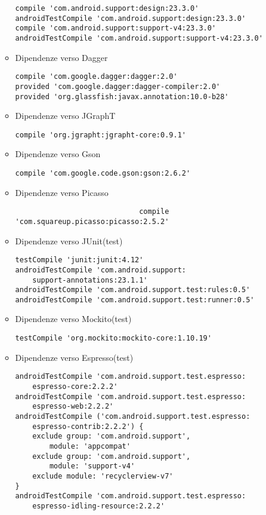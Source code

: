 \documentclass[../ManualeSviluppatore.tex]{subfiles}
\begin{document}
\begin{itemize}
\begin{itemize}
\begin{lstlisting}
compile 'com.android.support:design:23.3.0'
androidTestCompile 'com.android.support:design:23.3.0'
compile 'com.android.support:support-v4:23.3.0'
androidTestCompile 'com.android.support:support-v4:23.3.0'
						\end{lstlisting}
					\item Dipendenze verso Dagger
						\lstset{language=Java}
						\begin{lstlisting}
compile 'com.google.dagger:dagger:2.0'
provided 'com.google.dagger:dagger-compiler:2.0'
provided 'org.glassfish:javax.annotation:10.0-b28'
						\end{lstlisting}
					\item Dipendenze verso JGraphT
						\lstset{language=Java}
						\begin{lstlisting}
compile 'org.jgrapht:jgrapht-core:0.9.1'
						\end{lstlisting}
					\item Dipendenze verso Gson
						\lstset{language=Java}
						\begin{lstlisting}
compile 'com.google.code.gson:gson:2.6.2'
						\end{lstlisting}
					\item Dipendenze verso Picasso
						\begin{lstlisting}
							 compile 'com.squareup.picasso:picasso:2.5.2'
						\end{lstlisting}						
						
					\item Dipendenze verso JUnit(test)
						\lstset{language=Java}
						\begin{lstlisting}
testCompile 'junit:junit:4.12'
androidTestCompile 'com.android.support:
	support-annotations:23.1.1'
androidTestCompile 'com.android.support.test:rules:0.5'
androidTestCompile 'com.android.support.test:runner:0.5'
						\end{lstlisting}
					\item Dipendenze verso Mockito(test)
						\lstset{language=Java}
						\begin{lstlisting}
testCompile 'org.mockito:mockito-core:1.10.19'
						\end{lstlisting}
					\item Dipendenze verso Espresso(test)
						\lstset{language=Java}
						\begin{lstlisting}
androidTestCompile 'com.android.support.test.espresso:
	espresso-core:2.2.2'
androidTestCompile 'com.android.support.test.espresso:
	espresso-web:2.2.2'
androidTestCompile ('com.android.support.test.espresso:
	espresso-contrib:2.2.2') {
    exclude group: 'com.android.support', 
    	module: 'appcompat'
    exclude group: 'com.android.support', 
    	module: 'support-v4'
    exclude module: 'recyclerview-v7'
}
androidTestCompile 'com.android.support.test.espresso:
	espresso-idling-resource:2.2.2'
						\end{lstlisting}						
						

\end{itemize}
\end{itemize}
\end{document}
